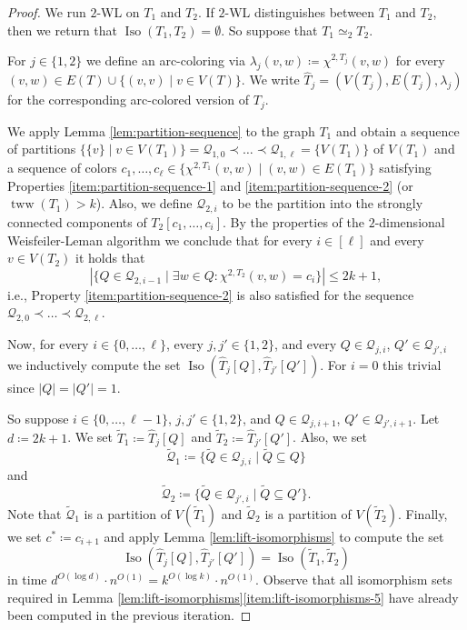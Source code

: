 \PassOptionsToPackage{dvipsnames,svgnames}{xcolor}\documentclass[10pt,a4paper]{article}
\newcommand{\CQ}{{\mathcal Q}}
\newcommand{\WL}[2]{\chi^{#1,#2}}
\DeclareMathOperator{\Iso}{Iso}
\DeclareMathOperator{\tww}{tww}
\begin{document}
\begin{proof}
 We run $2$-WL on $T_1$ and $T_2$.
 If $2$-WL distinguishes between $T_1$ and $T_2$, then we return that $\Iso(T_1,T_2) = \emptyset$.
 So suppose that $T_1 \simeq_2 T_2$.

 For $j \in \{1,2\}$ we define an arc-coloring via $\lambda_j(v,w) \coloneqq \WL{2}{T_j}(v,w)$ for every $(v,w) \in E(T) \cup \{(v,v) \mid v \in V(T)\}$.
 We write $\widehat{T}_j = (V(T_j),E(T_j),\lambda_j)$ for the corresponding arc-colored version of $T_j$.

 We apply Lemma \ref{lem:partition-sequence} to the graph $T_1$ and obtain a sequence of partitions $\{\{v\} \mid v \in V(T_1)\} = \CQ_{1,0} \prec \dots \prec \CQ_{1,\ell} = \{V(T_1)\}$ of $V(T_1)$ and a sequence of colors $c_1,\dots,c_\ell \in \{\WL{2}{T_1}(v,w) \mid (v,w) \in E(T_1)\}$ satisfying Properties \ref{item:partition-sequence-1} and \ref{item:partition-sequence-2} (or $\tww(T_1) > k$).
 Also, we define $\CQ_{2,i}$ to be the partition into the strongly connected components of $T_2[c_1,\dots,c_i]$.
 By the properties of the $2$-dimensional Weisfeiler-Leman algorithm we conclude that for every $i \in [\ell]$ and every $v \in V(T_2)$ it holds that
 \[|\{Q \in \CQ_{2,i-1} \mid \exists w \in Q \colon \WL{2}{T_2}(v,w) = c_i\}| \leq 2k+1,\]
 i.e., Property \ref{item:partition-sequence-2} is also satisfied for the sequence $\CQ_{2,0} \prec \dots \prec \CQ_{2,\ell}$.

 Now, for every $i \in \{0,\dots,\ell\}$, every $j,j' \in \{1,2\}$, and every $Q \in \CQ_{j,i}$, $Q' \in \CQ_{j',i}$ we inductively compute the set $\Iso(\widehat{T}_j[Q],\widehat{T}_{j'}[Q'])$.
 For $i = 0$ this trivial since $|Q| = |Q'| = 1$.

 So suppose $i \in \{0,\dots,\ell-1\}$, $j,j' \in \{1,2\}$, and $Q \in \CQ_{j,i+1}$, $Q' \in \CQ_{j',i+1}$.
 Let $d \coloneqq 2k+1$.
 We set $\widetilde{T}_1 \coloneqq \widehat{T}_j[Q]$ and $\widetilde{T}_2 \coloneqq \widehat{T}_{j'}[Q']$.
 Also, we set
 \[\widetilde{\CQ}_1 \coloneqq \{\widetilde{Q} \in \CQ_{j,i} \mid \widetilde{Q} \subseteq Q\}\]
 and
 \[\widetilde{\CQ}_2 \coloneqq \{\widetilde{Q} \in \CQ_{j',i} \mid \widetilde{Q} \subseteq Q'\}.\]
 Note that $\widetilde{\CQ}_1$ is a partition of $V(\widetilde{T}_1)$ and $\widetilde{\CQ}_2$ is a partition of $V(\widetilde{T}_2)$.
 Finally, we set $c^* \coloneqq c_{i+1}$ and apply Lemma \ref{lem:lift-isomorphisms} to compute the set
 \[\Iso(\widehat{T}_j[Q],\widehat{T}_{j'}[Q']) = \Iso(\widetilde{T}_1,\widetilde{T}_2)\]
 in time $d^{O(\log d)} \cdot n^{O(1)} = k^{O(\log k)} \cdot n^{O(1)}$.
 Observe that all isomorphism sets required in Lemma \ref{lem:lift-isomorphisms}\ref{item:lift-isomorphisms-5} have already been computed in the previous iteration.


\end{proof}
\end{document}
